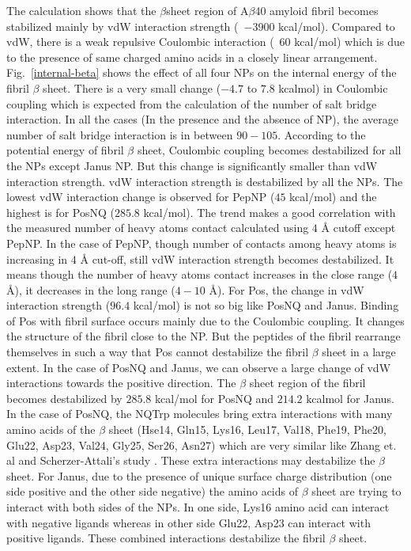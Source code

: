 \documentclass[journal=jacsat,manuscript=communication]{achemso}
\begin{document}
The calculation shows that the $\beta$sheet region of A$\beta$40 amyloid fibril
becomes stabilized mainly by vdW interaction strength (~$-3900$ kcal/mol).
Compared to vdW, there is a weak repulsive Coulombic interaction (~$60$
kcal/mol) which is due to the presence of same charged amino acids in a closely
linear arrangement. Fig.~\ref{internal-beta} shows the effect of all four NPs on
the internal energy of the fibril $\beta$ sheet.  There is a very small change
($-4.7$ to $7.8$ kcalmol) in Coulombic coupling which is expected from the
calculation of the number of salt bridge interaction.  In all the cases (In the
presence and the absence of NP), the average number of salt bridge interaction
is in between $90-105$. According to the potential energy of fibril $\beta$
sheet, Coulombic coupling becomes destabilized for all the NPs except Janus NP.
But this change is significantly smaller than vdW interaction strength. vdW
interaction strength is destabilized by all the NPs.  The lowest vdW interaction
change is observed for PepNP ($45$ kcal/mol) and the highest is for PosNQ
($285.8$ kcal/mol). The trend makes a good correlation with the measured number
of heavy atoms contact calculated using $4$ {\AA} cutoff except PepNP. In the
case of PepNP, though number of contacts among heavy atoms is increasing in $4$
{\AA} cut-off, still vdW interaction strength becomes destabilized. It means
though the number of heavy atoms contact increases in the close range ($4$
{\AA}), it decreases in the long range ($4-10$ {\AA}).  For Pos, the change in
vdW interaction strength ($96.4$ kcal/mol) is not so big like PosNQ and Janus.
Binding of Pos with fibril surface occurs mainly due to the Coulombic coupling.
It changes the structure of the fibril close to the NP. But the peptides of the
fibril rearrange themselves in such a way that Pos cannot destabilize the fibril
$\beta$ sheet in a large extent. In the case of PosNQ and Janus, we can observe
a large change of vdW interactions towards the positive direction. The $\beta$
sheet region of the fibril becomes destabilized by $285.8$ kcal/mol for PosNQ
and $214.2$ kcalmol for Janus. In the case of PosNQ, the NQTrp molecules bring
extra interactions with many amino acids of the $\beta$ sheet (Hse14, Gln15,
Lys16, Leu17, Val18, Phe19, Phe20, Glu22, Asp23, Val24, Gly25, Ser26, Asn27)
which are very similar like Zhang et. al and Scherzer-Attali's study
\cite{Attali2010, Zhang2014}.  These extra interactions may destabilize the
$\beta$ sheet. For Janus, due to the presence of unique surface charge
distribution (one side positive and the other side negative) the amino acids of
$\beta$ sheet are trying to interact with both sides of the NPs.  In one side,
Lys16 amino acid can interact with negative ligands whereas in other side Glu22,
Asp23 can interact with positive ligands. These combined interactions
destabilize the fibril $\beta$ sheet. 
  
\end{document}
